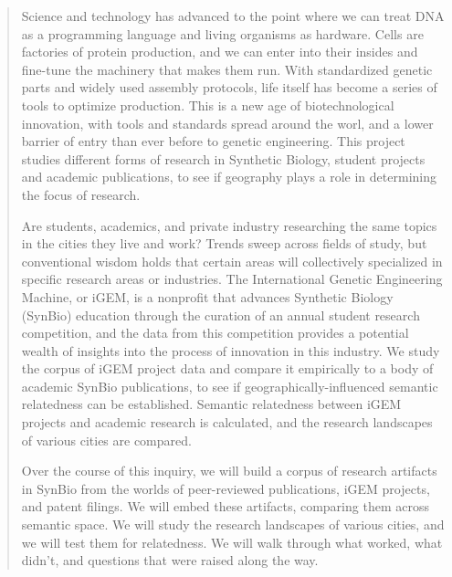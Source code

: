 \documentclass[12pt,a4paper]{article}
\begin{document}
	\maketitle
	
	\vspace{1em}
	
	\begin{abstract}
		Science and technology has advanced to the point where we can treat DNA as a programming language and living organisms as hardware. Cells are factories of protein production, and we can enter into their insides and fine-tune the machinery that makes them run. With standardized genetic parts and widely used assembly protocols, life itself has become a series of tools to optimize production. This is a new age of biotechnological innovation, with tools and standards spread around the worl, and a lower barrier of entry than ever before to genetic engineering. This project studies different forms of research in Synthetic Biology, student projects and academic publications, to see if geography plays a role in determining the focus of research.
		
		Are students, academics, and private industry researching the same topics in the cities they live and work? Trends sweep across fields of study, but conventional wisdom holds that certain areas will collectively specialized in specific research areas or industries. The International Genetic Engineering Machine, or iGEM, is a nonprofit that advances Synthetic Biology (SynBio) education through the curation of an annual student research competition, and the data from this competition provides a potential wealth of insights into the process of innovation in this industry. We study the corpus of iGEM project data and compare it empirically to a body of academic SynBio publications, to see if geographically-influenced semantic relatedness can be established. Semantic relatedness between iGEM projects and academic research is calculated, and the research landscapes of various cities are compared.
		
		Over the course of this inquiry, we will build a corpus of research artifacts in SynBio from the worlds of peer-reviewed publications, iGEM projects, and patent filings. We will embed these artifacts, comparing them across semantic space. We will study the research landscapes of various cities, and we will test them for relatedness. We will walk through what worked, what didn't, and questions that were raised along the way.
		
	\end{abstract}
	
\end{document}

